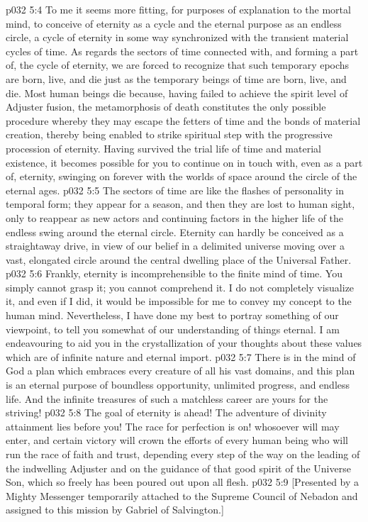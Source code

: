 \vs p032 5:4 To me it seems more fitting, for purposes of explanation to the mortal mind, to conceive of eternity as a cycle and the eternal purpose as an endless circle, a cycle of eternity in some way synchronized with the transient material cycles of time. As regards the sectors of time connected with, and forming a part of, the cycle of eternity, we are forced to recognize that such temporary epochs are born, live, and die just as the temporary beings of time are born, live, and die. Most human beings die because, having failed to achieve the spirit level of Adjuster fusion, the metamorphosis of death constitutes the only possible procedure whereby they may escape the fetters of time and the bonds of material creation, thereby being enabled to strike spiritual step with the progressive procession of eternity. Having survived the trial life of time and material existence, it becomes possible for you to continue on in touch with, even as a part of, eternity, swinging on forever with the worlds of space around the circle of the eternal ages.
\vs p032 5:5 The sectors of time are like the flashes of personality in temporal form; they appear for a season, and then they are lost to human sight, only to reappear as new actors and continuing factors in the higher life of the endless swing around the eternal circle. Eternity can hardly be conceived as a straightaway drive, in view of our belief in a delimited universe moving over a vast, elongated circle around the central dwelling place of the Universal Father.
\vs p032 5:6 Frankly, eternity is incomprehensible to the finite mind of time. You simply cannot grasp it; you cannot comprehend it. I do not completely visualize it, and even if I did, it would be impossible for me to convey my concept to the human mind. Nevertheless, I have done my best to portray something of our viewpoint, to tell you somewhat of our understanding of things eternal. I am endeavouring to aid you in the crystallization of your thoughts about these values which are of infinite nature and eternal import.
\vs p032 5:7 \pc There is in the mind of God a plan which embraces every creature of all his vast domains, and this plan is an eternal purpose of boundless opportunity, unlimited progress, and endless life. And the infinite treasures of such a matchless career are yours for the striving!
\vs p032 5:8 The goal of eternity is ahead! The adventure of divinity attainment lies before you! The race for perfection is on! whosoever will may enter, and certain victory will crown the efforts of every human being who will run the race of faith and trust, depending every step of the way on the leading of the indwelling Adjuster and on the guidance of that good spirit of the Universe Son, which so freely has been poured out upon all flesh.
\vsetoff
\vs p032 5:9 [Presented by a Mighty Messenger temporarily attached to the Supreme Council of Nebadon and assigned to this mission by Gabriel of Salvington.]
